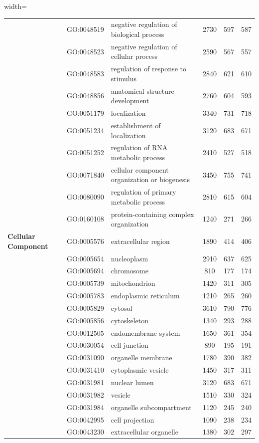 \documentclass[10pt]{article}
\begin{document}
\begin{table}[h!]
\begin{adjustbox}{width=\textwidth}
\begin{tabular}{lllccc}
& GO:0048519 & negative regulation of biological process & 2730 & 597 & 587 \\
& GO:0048523 & negative regulation of cellular process & 2590 & 567 & 557 \\
& GO:0048583 & regulation of response to stimulus & 2840 & 621 & 610 \\
& GO:0048856 & anatomical structure development & 2760 & 604 & 593 \\
& GO:0051179 & localization & 3340 & 731 & 718 \\
& GO:0051234 & establishment of localization & 3120 & 683 & 671 \\
& GO:0051252 & regulation of RNA metabolic process & 2410 & 527 & 518 \\
& GO:0071840 & cellular component organization or biogenesis & 3450 & 755 & 741 \\
& GO:0080090 & regulation of primary metabolic process & 2810 & 615 & 604 \\
& GO:0160108 & protein-containing complex organization & 1240 & 271 & 266 \\
\midrule
\textbf{Cellular Component} & GO:0005576 & extracellular region & 1890 & 414 & 406 \\
& GO:0005654 & nucleoplasm & 2910 & 637 & 625 \\
& GO:0005694 & chromosome & 810 & 177 & 174 \\
& GO:0005739 & mitochondrion & 1420 & 311 & 305 \\
& GO:0005783 & endoplasmic reticulum & 1210 & 265 & 260 \\
& GO:0005829 & cytosol & 3610 & 790 & 776 \\
& GO:0005856 & cytoskeleton & 1340 & 293 & 288 \\
& GO:0012505 & endomembrane system & 1650 & 361 & 354 \\
& GO:0030054 & cell junction & 890 & 195 & 191 \\
& GO:0031090 & organelle membrane & 1780 & 390 & 382 \\
& GO:0031410 & cytoplasmic vesicle & 1450 & 317 & 311 \\
& GO:0031981 & nuclear lumen & 3120 & 683 & 671 \\
& GO:0031982 & vesicle & 1510 & 330 & 324 \\
& GO:0031984 & organelle subcompartment & 1120 & 245 & 240 \\
& GO:0042995 & cell projection & 1090 & 238 & 234 \\
& GO:0043230 & extracellular organelle & 1380 & 302 & 297 \\

\end{tabular}
\end{adjustbox}
\end{table}
\end{document}
